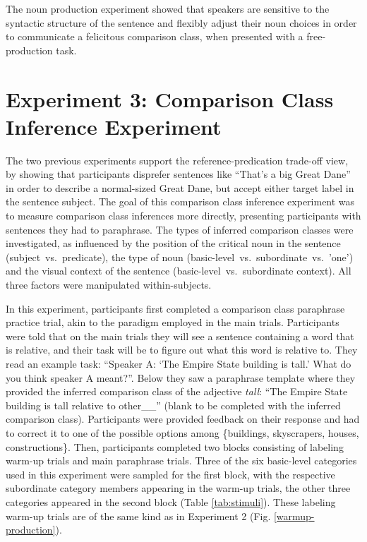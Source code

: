 The noun production experiment showed that speakers are sensitive to the syntactic structure of the sentence and flexibly adjust their noun choices in order to communicate a felicitous comparison class, when presented with a free-production task.  
 
 
\section{Experiment 3: Comparison Class Inference Experiment}
\label{experiment3}
The two previous experiments support the reference-predication trade-off view, by showing that participants disprefer sentences like “That’s a big Great Dane” in order to describe a normal-sized Great Dane, but accept either target label in the sentence subject. The goal of this comparison class inference experiment was to measure comparison class inferences more directly, presenting participants with sentences they had to paraphrase. The types of inferred comparison classes were investigated, as influenced by the position of the critical noun in the sentence (subject~vs.~predicate), the type of noun (basic-level~vs.~subordinate~vs.~'one') and the visual context of the sentence (basic-level~vs.~subordinate context). All three factors were manipulated within-subjects.

In this experiment, participants first completed a comparison class paraphrase practice trial, akin to the paradigm employed in the main trials. Participants were told that on the main trials they will see a sentence containing a word that is relative, and their task will be to figure out what this word is relative to. They read an example task: “Speaker A: ‘The Empire State building is tall.’ What do you think speaker A meant?”. Below they saw a paraphrase template where they provided the inferred comparison class of the adjective \emph{tall}: “The Empire State building is tall relative to other\_\_” (blank to be completed with the inferred comparison class). Participants were provided feedback on their response and had to correct it to one of the possible options among \{buildings, skyscrapers, houses, constructions\}. 
Then, participants completed two blocks consisting of labeling warm-up trials and main paraphrase trials. Three of the six basic-level categories used in this experiment were sampled for the first block, with the respective subordinate category members appearing in the warm-up trials, the other three categories appeared in the second block (Table \ref{tab:stimuli}). These labeling warm-up trials are of the same kind as in Experiment 2 (Fig. \ref{warmup-production}). 

